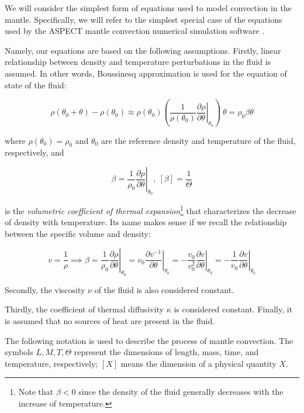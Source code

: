 \documentclass[
10pt, %
a4paper, %
oneside, %
headinclude,footinclude, %
BCOR5mm, %
]{scrartcl}
\begin{document}
We will consider the simplest form of equations used to model convection in the mantle. Specifically, we will refer to the simplest special case of the equations used by the ASPECT mantle convection numerical simulation software \cite[p. 13]{aspect}. 

Namely, our equations are based on the following assumptions. Firstly, linear relationship between density and temperature perturbations in the fluid is assumed. In other words, Boussinesq approximation is used for the equation of state of the fluid: 

\begin{equation} \label{density}
\rho(\theta_0 + \theta) - \rho(\theta_0) \approx \rho(\theta_0) (\left. \frac{1}{\rho(\theta_0)}\frac{\partial \rho}{\partial \theta} \right|_{\theta_0}) ~\theta = \rho_0 \beta\theta
\end{equation}

where $\rho(\theta_0) = \rho_0$ and $\theta_0$ are the reference density and temperature of the fluid, respectively, and

$$ \beta = \left. \frac{1}{\rho_0}\frac{\partial \rho}{\partial \theta} \right|_{\theta_0}, ~ [\beta] = \frac{1}{\Theta}$$

is the \emph{volumetric coefficient of thermal expansion}\footnote{Note that $\beta < 0 $ since the density of the fluid generally decreases with the increase of temperature.} that characterizes the decrease of density with temperature. Its name makes sense if we recall the relationship between the specific volume and density:

$$ v = \frac{1}{\rho} \implies \beta = \left. \frac{1}{\rho_0}\frac{\partial \rho}{\partial \theta} \right|_{\theta_0} = \left. v_0 \frac{\partial v^{-1}}{\partial \theta} \right|_{\theta_0} = \left. -\frac{v_0}{v_0^2} \frac{\partial v}{\partial \theta} \right|_{\theta_0} = \left. -\frac{1}{v_0} \frac{\partial v}{\partial \theta} \right|_{\theta_0} $$

Secondly, the viscosity $\nu$ of the fluid is also considered constant.

Thirdly, the coefficient of thermal diffusivity $\kappa$ is considered constant. Finally, it is assumed that no sources of heat are present in the fluid.

The following notation is used to describe the process of mantle convection. The symbols $L, M, T, \Theta$ represent the dimensions of length, mass, time, and temperature, respectively; $[X]$ means the dimension of a physical quantity $X$.
\end{document}
